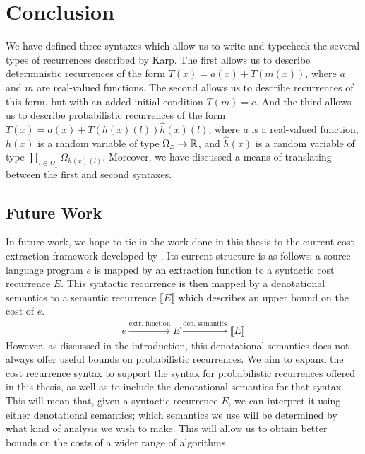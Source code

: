 \chapter{Conclusion}

We have defined three syntaxes which allow us to write and typecheck the several types of recurrences
described by Karp. The first allows us to describe deterministic recurrences of the form $T(x) = a(x) + T(m(x))$, where $a$ and $m$ are real-valued functions. The second allows us to describe recurrences of this form, but with an added initial 
condition $T(m) = c$. And the third allows us to describe probabilistic recurrences of the form 
$T(x) = a(x) + T(h(x)(l))\hat{h}(x)(l)$, where $a$ is a real-valued function, $h(x)$ is a random variable of type
$\Omega_x \rightarrow \mathbb{R}$, and $\hat{h}(x)$ is a random variable of type
 $\prod_{l \in \Omega_x} \Omega_{h(x)(l)}$. Moreover, we have discussed a means of translating between
 the first and second syntaxes. 
 
 \section{Future Work}
 In future work, we hope to tie in the work done in this thesis to the current cost extraction framework developed
 by \cite{N.-Danner:2015aa}. Its current structure is as follows: a source language program $e$ is mapped by an 
 extraction function to a syntactic cost recurrence $E$. This syntactic recurrence is then mapped by a denotational
 semantics to a semantic recurrence $\llbracket E \rrbracket$ which describes an upper bound on the cost of $e$. 
 \begin{align*}
 e\xrightarrow{\text{extr. function}}E\xrightarrow{\text{den. semantics}}\llbracket E \rrbracket
 \end{align*}
 However, as discussed in the introduction, this denotational semantics does not always offer useful bounds on 
 probabilistic recurrences. We aim to expand the cost recurrence syntax to support the syntax for 
 probabilistic recurrences offered in this thesis, as well as to include the denotational semantics for that syntax.
 This will mean that, given a syntactic recurrence $E$, we can interpret it using either denotational semantics;
which semantics we use will be determined by what kind of analysis we wish to make. This will allow us to obtain 
better bounds on the costs of a wider range of algorithms.